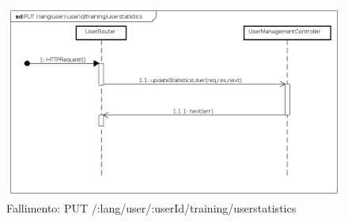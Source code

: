 \begin{itemize}
\begin{figure}[ht]
	\centering
	\includegraphics[scale=0.45]{UML/DiagrammiDiSequenza/Back-end/PUT__lang_user__userId_training_userstatistics_failure.png}
	\caption{Fallimento: PUT /:lang/user/:userId/training/userstatistics}
\end{figure}
\FloatBarrier

\end{itemize}








